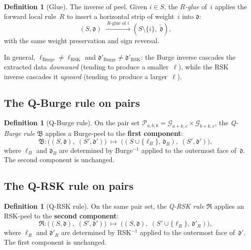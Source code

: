 \documentclass[11pt]{article}
\theoremstyle{plain}
\theoremstyle{definition}
\newtheorem{definition}[theorem]{Definition}
\begin{document}
\begin{definition}[Glue]
\label{def:glue}
The inverse of peel.  Given $i \in S$, the \emph{$R$-glue}
of~$i$ applies the forward local rule~$R$ to insert a
horizontal strip of weight~$i$ into $\mathfrak{d}$:
\[
  (S, \mathfrak{d})
  \;\xrightarrow{\;\text{$R$-glue of $i$}\;}
  (S \setminus \{i\},\; \tilde{\mathfrak{d}}),
\]
with the same weight preservation and sign reversal.
\end{definition}

In general, $\ell_{\text{Burge}} \neq \ell_{\text{RSK}}$ and
$\mathfrak{d}'_{\text{Burge}} \neq \mathfrak{d}'_{\text{RSK}}$:
the Burge inverse cascades the extracted data \emph{downward}
(tending to produce a smaller~$\ell$), while the RSK inverse
cascades it \emph{upward} (tending to produce a larger~$\ell$).


\subsection{The Q-Burge rule on pairs}

\begin{definition}[Q-Burge rule]
\label{def:Q-Burge}
On the pair set $\mathcal{P}_{a,b,k} = \mathcal{G}_{a+k,c}
\times \mathcal{G}_{b+k,c}$, the \emph{Q-Burge rule}
$\mathfrak{B}$ applies a Burge-peel to the \textbf{first
component}:
\[
  \mathfrak{B}\colon
  \bigl((S, \mathfrak{d}),\; (S', \mathfrak{d}')\bigr)
  \;\longmapsto\;
  \bigl((S \cup \{\ell_B\},\, \mathfrak{d}_B),\;
    (S', \mathfrak{d}')\bigr),
\]
where $\ell_B$ and $\mathfrak{d}_B$ are determined by
Burge$^{-1}$ applied to the outermost face of~$\mathfrak{d}$.
The second component is unchanged.
\end{definition}

\subsection{The Q-RSK rule on pairs}

\begin{definition}[Q-RSK rule]
\label{def:Q-RSK}
On the same pair set, the \emph{Q-RSK rule} $\mathfrak{R}$
applies an RSK-peel to the \textbf{second component}:
\[
  \mathfrak{R}\colon
  \bigl((S, \mathfrak{d}),\; (S', \mathfrak{d}')\bigr)
  \;\longmapsto\;
  \bigl((S, \mathfrak{d}),\;
    (S' \cup \{\ell_R\},\, \mathfrak{d}'_R)\bigr),
\]
where $\ell_R$ and $\mathfrak{d}'_R$ are determined by
RSK$^{-1}$ applied to the outermost face
of~$\mathfrak{d}'$.  The first component is unchanged.
\end{definition}
\end{document}

